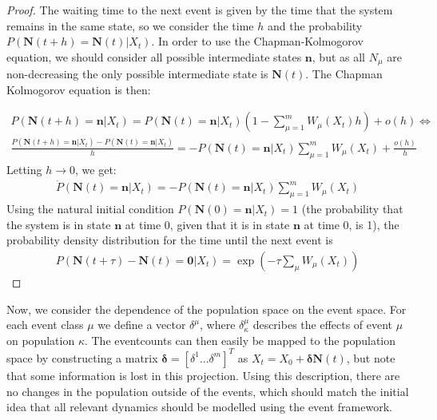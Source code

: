 \documentclass[10pt,a4paper]{article}
\begin{document}
\begin{proof}
	The waiting time to the next event is given by the time that the system remains in the same state, so we consider the time $h$ and the probability $P \left( \bm{N} \left( t + h \right) = \bm{N} \left( t \right) | X_t \right)$. In order to use the Chapman-Kolmogorov equation, we should consider all possible intermediate states $\bm{n}$, but as all $N_\mu$ are non-decreasing the only possible intermediate state is $\bm{N} \left( t \right)$. The Chapman Kolmogorov equation is then:
	
		\begin{align*}
			P \left( \bm{N} \left( t + h \right) = \bm{n} | X_t \right) = P \left( \bm{N} \left( t \right) = \bm{n} | X_t \right) \left( 1 - \sum_{\mu = 1}^m W_\mu \left( X_t \right) h \right) + o \left( h \right) \Leftrightarrow \\
			\frac{P \left( \bm{N} \left( t + h \right) = \bm{n} | X_t \right) - P \left( \bm{N} \left( t \right) = \bm{n} | X_t \right)}{h} = - P \left( \bm{N} \left( t \right) = \bm{n} | X_t \right) \sum_{\mu = 1}^m W_{\mu}\left( X_t \right) + \frac{o\left( h  \right)}{h}
		\end{align*}
	Letting $h \rightarrow 0$, we get:
		\begin{align*}
			\dot{P} \left( \bm{N} \left( t \right) = \bm{n} | X_t \right) = - P \left( \bm{N} \left( t \right) = \bm{n} | X_t \right) \sum_{\mu = 1}^m W_\mu \left( X_t \right)
		\end{align*}
	Using the natural initial condition $P \left( \bm{N} \left( 0 \right) = \bm{n} | X_t \right) = 1 $ (the probability that the system is in state $\bm{n}$ at time $0$, given that it is in state $\bm{n}$ at time 0, is 1), the probability density distribution for the time until the next event is
		\begin{align*}
			P \left( \bm{N} \left( t + \tau \right) - \bm{N} \left( t \right) = \bm{0} | X_t \right) = \exp \left( -\tau \sum_{\mu} W_\mu \left( X_t \right) \right)
		\end{align*}
\end{proof}

Now, we consider the dependence of the population space on the event space. For each event class $\mu$ we define a vector $\delta^\mu$, where $\delta^\mu_\kappa$ describes the effects of event $\mu$ on population $\kappa$. The eventcounts can then easily be mapped to the population space by constructing a matrix $\bm{\delta} = \left[ \delta^1 \ldots \delta^m \right]^{T}$ as $X_t = X_0 + \bm{\delta} \bm{N} \left( t \right)$, but note that some information is lost in this projection. Using this description, there are no changes in the population outside of the events, which should match the initial idea that all relevant dynamics should be modelled using the event framework.
\end{document}
